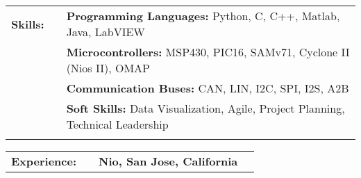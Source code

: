 \documentclass{minimal}
\begin{document}

\begin{center}
\fontsize{14}{12.8}\selectfont
\name\\
\fontsize{10}{12}\selectfont
\address\\
\phone\\
\email\\
\github\\
\end{center}
\vspace{0.5cm}

\begin{tabular}{ p{1.5cm} p{1cm} p{16cm} }
\textbf{Skills:} & & \textbf{Programming Languages:} Python, C, C++, Matlab, Java, LabVIEW\\
& & \textbf{Microcontrollers:} MSP430, PIC16, SAMv71, Cyclone II (Nios II), OMAP\\
& & \textbf{Communication Buses:} CAN, LIN, I2C, SPI, I2S, A2B\\
& & \textbf{Soft Skills:} Data Visualization, Agile, Project Planning, Technical Leadership\\
& & \\
\end{tabular}

\begin{tabular}{ p{1.5cm} p{1cm} p{16cm} >{\raggedleft\arraybackslash}p{3cm} }
\textbf{Experience:} & & \textbf{Nio, San Jose, California} & \\
\end{tabular}
\end{document}
